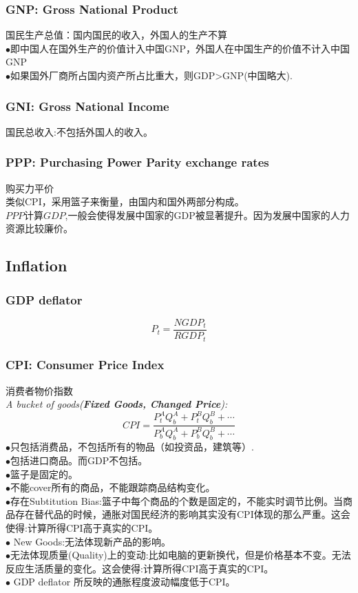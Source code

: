 \documentclass[UTF8, onecolumn, a4paper, 12pt]{article}
\begin{document}
\subsubsection{GNP: Gross National Product}
国民生产总值：国内国民的收入，外国人的生产不算\\
$\bullet$即中国人在国外生产的价值计入中国GNP，外国人在中国生产的价值不计入中国GNP\\
$\bullet$如果国外厂商所占国内资产所占比重大，则GDP>GNP(中国略大).
\subsubsection{GNI: Gross National Income}
国民总收入:不包括外国人的收入。
\subsubsection{PPP: Purchasing Power Parity exchange rates}
购买力平价\\
类似CPI，采用篮子来衡量，由国内和国外两部分构成。\\
$PPP$计算$GDP$,一般会使得发展中国家的GDP被显著提升。因为发展中国家的人力资源比较廉价。
\subsection{Inflation}
\subsubsection{GDP deflator}
$$P_t = \frac{NGDP_t}{RGDP_t}$$
\subsubsection{CPI: Consumer Price Index}
消费者物价指数\\
\textit{A bucket of goods(\textbf{Fixed Goods, Changed Price}):}
$$CPI = \frac{P_t^AQ_b^A + P_t^BQ_b^B + \cdots}{P_b^AQ_b^A + P_b^BQ_b^B + \cdots}$$
$\bullet$只包括消费品，不包括所有的物品（如投资品，建筑等）.\\
$\bullet$包括进口商品。而GDP不包括。\\
$\bullet$篮子是固定的。\\
$\bullet$不能cover所有的商品，不能跟踪商品结构变化。\\
$\bullet$存在Subtitution Bias:篮子中每个商品的个数是固定的，不能实时调节比例。当商品存在替代品的时候，通胀对国民经济的影响其实没有CPI体现的那么严重。这会使得:计算所得CPI高于真实的CPI。\\
$\bullet$ New Goods:无法体现新产品的影响。\\
$\bullet$无法体现质量(Quality)上的变动:比如电脑的更新换代，但是价格基本不变。无法反应生活质量的变化。这会使得:计算所得CPI高于真实的CPI。\\
$\bullet$ GDP deflator 所反映的通胀程度波动幅度低于CPI。
\end{document}
